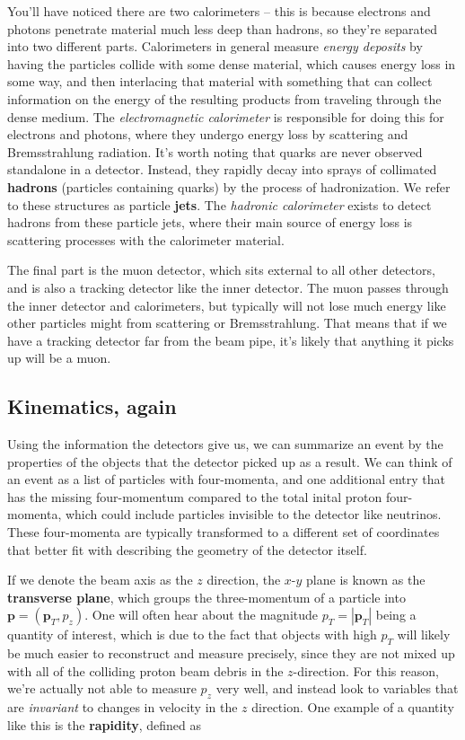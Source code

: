 \documentclass[
  11pt,
  numbers=noendperiod]{book}
\begin{document}
You'll have noticed there are two calorimeters -- this is because
electrons and photons penetrate material much less deep than hadrons, so
they're separated into two different parts. Calorimeters in general
measure \emph{energy deposits} by having the particles collide with some
dense material, which causes energy loss in some way, and then
interlacing that material with something that can collect information on
the energy of the resulting products from traveling through the dense
medium. The \emph{electromagnetic calorimeter} is responsible for doing
this for electrons and photons, where they undergo energy loss by
scattering and Bremsstrahlung radiation. It's worth noting that quarks
are never observed standalone in a detector. Instead, they rapidly decay
into sprays of collimated \textbf{hadrons} (particles containing quarks)
by the process of hadronization. We refer to these structures as
particle \textbf{jets}. The \emph{hadronic calorimeter} exists to detect
hadrons from these particle jets, where their main source of energy loss
is scattering processes with the calorimeter material.

The final part is the muon detector, which sits external to all other
detectors, and is also a tracking detector like the inner detector. The
muon passes through the inner detector and calorimeters, but typically
will not lose much energy like other particles might from scattering or
Bremsstrahlung. That means that if we have a tracking detector far from
the beam pipe, it's likely that anything it picks up will be a muon.

\hypertarget{kinematics-again}{%
\subsection{Kinematics, again}\label{kinematics-again}}

Using the information the detectors give us, we can summarize an event
by the properties of the objects that the detector picked up as a
result. We can think of an event as a list of particles with
four-momenta, and one additional entry that has the missing
four-momentum compared to the total inital proton four-momenta, which
could include particles invisible to the detector like neutrinos. These
four-momenta are typically transformed to a different set of coordinates
that better fit with describing the geometry of the detector itself.

If we denote the beam axis as the \(z\) direction, the \(x\)-\(y\) plane
is known as the \textbf{transverse plane}, which groups the
three-momentum of a particle into \(\mathbf{p} = (\mathbf{p}_T, p_z)\).
One will often hear about the magnitude \(p_T = |\mathbf{p}_T|\) being a
quantity of interest, which is due to the fact that objects with high
\(p_T\) will likely be much easier to reconstruct and measure precisely,
since they are not mixed up with all of the colliding proton beam debris
in the \(z\)-direction. For this reason, we're actually not able to
measure \(p_z\) very well, and instead look to variables that are
\emph{invariant} to changes in velocity in the \(z\) direction. One
example of a quantity like this is the \textbf{rapidity}, defined as
\end{document}
